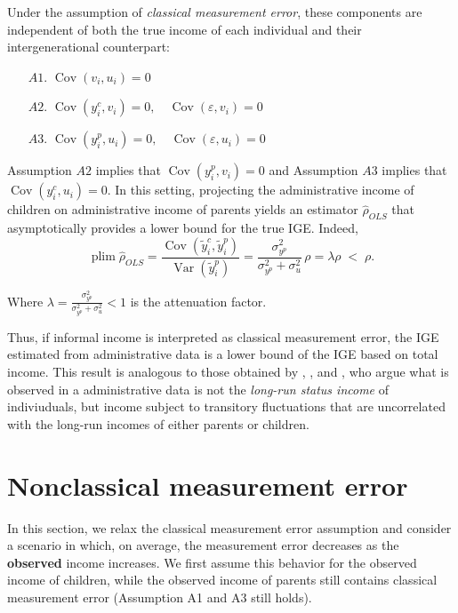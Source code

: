 \documentclass[12pt,oneside]{article}
\DeclareMathOperator*{\plim}{plim}
\theoremstyle{bracket}
\begin{document}
\begin{tcolorbox}[title=Classical measurement error Assumptions, colback=white, colframe=black]
Under the assumption of \textit{classical measurement error}, these components are independent of both the true income of each individual and their intergenerational counterpart:
\begin{itemize}
    \item[$A1.$] $\operatorname{Cov}(v_i,u_i) = 0$
    \item[$A2.$] $\operatorname{Cov}(y_i^c,v_i) = 0, \quad \operatorname{Cov}(\varepsilon,v_i)=0$
    \item[$A3.$] $\operatorname{Cov}(y_i^p,u_i) = 0, \quad \operatorname{Cov}(\varepsilon,u_i)=0$
\end{itemize}
\end{tcolorbox}

Assumption $A2$ implies that $\operatorname{Cov}(y_i^p,v_i)=0$ and Assumption $A3$ implies that $\operatorname{Cov}(y_i^c,u_i)=0$.
In this setting, projecting the administrative income of children on administrative income of parents yields an estimator $\hat{\rho}_{OLS}$ that asymptotically provides a lower bound for the true IGE. Indeed,
\[
\plim \hat{\rho}_{OLS} 
= \frac{\operatorname{Cov}(\tilde{y}_i^c,\tilde{y}_i^p)}{\operatorname{Var}(\tilde{y}_i^p)}
= \frac{ \sigma_{y^p}^2}{ \sigma_{y^p}^2+\sigma^2_u}\,\rho = \lambda\rho
\;<\; \rho.
\]

Where $\lambda =\frac{ \sigma_{y^p}^2}{ \sigma_{y^p}^2+\sigma^2_u}<1$ is the attenuation factor. 

Thus, if informal income is interpreted as classical measurement error, the IGE estimated from administrative data is a lower bound of the IGE based on total income. This result is analogous to those obtained by \cite{Zimmerman_1992}, \cite{Solon_1992}, and \cite{Björklund_1997}, who argue what is observed in a administrative data is not the \textit{long-run status income} of indiviuduals, but income subject to transitory fluctuations that are uncorrelated with the long-run incomes of either parents or children.

\section{Nonclassical measurement error}

In this section, we relax the classical measurement error assumption and consider a scenario in which, on average, the measurement error decreases as the \textbf{observed} income increases.  
We first assume this behavior for the observed income of children, while the observed income of parents still contains classical measurement error (Assumption A1 and A3 still holds).
\end{document}
